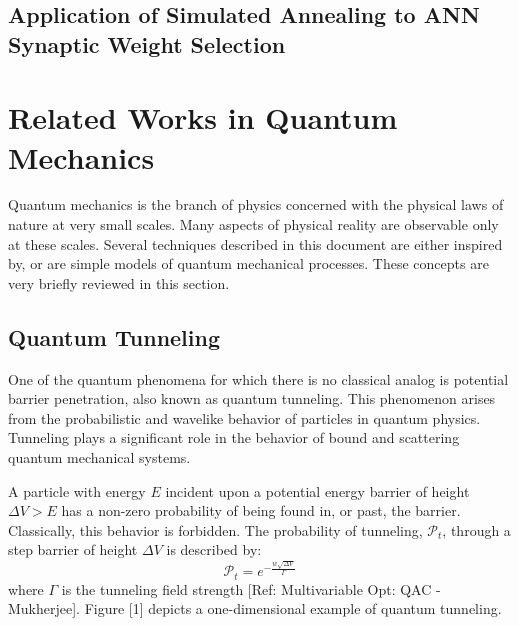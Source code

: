 \documentclass[11pt]{afthesis}
\begin{document}
	\subsection{Application of Simulated Annealing to ANN Synaptic Weight Selection}
	
	
	\section{Related Works in Quantum Mechanics}
	
	
	Quantum mechanics is the branch of physics concerned with the physical laws of nature at very small scales. Many aspects of physical reality are observable only at these scales. Several techniques described in this document are either inspired by, or are simple models of quantum mechanical processes. These concepts are very briefly reviewed in this section. 
	
	\subsection{Quantum Tunneling} 
	
	
	
	One of the quantum phenomena for which there is no classical analog is potential barrier penetration, also known as quantum tunneling. This phenomenon arises from the probabilistic and wavelike behavior of particles in quantum physics. Tunneling plays a significant role in the behavior of bound and scattering quantum mechanical systems.
	
	A particle with energy \begin{math} E \end{math} incident upon a potential energy barrier of height \begin{math} \Delta V > E  \end{math} has a non-zero probability of being found in, or past, the barrier. Classically, this behavior is forbidden. The probability of tunneling, \begin{math} \mathcal{P}_t \end{math}, through a step barrier of height \begin{math} \Delta V  \end{math} is described by: 
	\begin{equation}
	\mathcal{P}_t = e^{-\frac{w \sqrt{\Delta V}}{ \Gamma}} 
	\end{equation} where \begin{math} \Gamma \end{math} is the tunneling field strength [Ref: Multivariable Opt: QAC - Mukherjee]. Figure [1] depicts a one-dimensional example of quantum tunneling.
	
\end{document}
